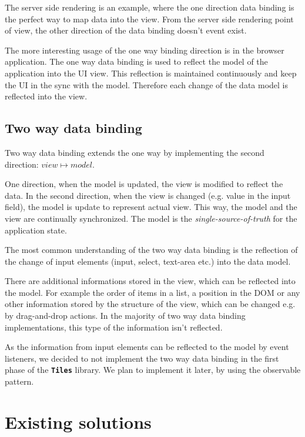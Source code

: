 \documentclass[oneside, 12pt]{book}
\newcommand{\tiles}[0]{\textbf{\texttt{Tiles}} }
\begin{document}
		The server side rendering is an example, 
		where the one direction data binding is the perfect way to map data into the view.
		From the server side rendering point of view, 
		the other direction of the data binding doesn't event exist.

		The more interesting usage of the one way binding direction is in the browser application. 
		The one way data binding is used to reflect the model of the application into the UI view.
		This reflection is maintained continuously and keep the UI in the sync with the model. 
		Therefore each change of the data model is reflected into the view. 

	\section{Two way data binding}

		Two way data binding extends the one way by implementing the second direction: $view \mapsto model$. 

		One direction, when the model is updated, the view is modified to reflect the data.
		In the second direction, when the view is changed (e.g. value in the input field), 
		the model is update to represent actual view. 
		This way, the model and the view are continually synchronized.
		The model is the \textit{single-source-of-truth} for the application state\cite{angular}.

		The most common understanding of the two way data binding is the reflection of the change of input elements
		(input, select, text-area etc.) into the data model.

		There are additional informations stored in the view, which can be reflected into the model.
		For example the order of items in a list, a position in the DOM or any other information stored by the structure of the view, 
		which can be changed e.g. by drag-and-drop actions. 
		In the majority of two way data binding implementations, this type of the information isn't reflected.

		As the information from input elements can be reflected to the model by event listeners, 
		we decided to not implement the two way data binding in the first phase of the \tiles library.
		We plan to implement it later, by using the observable pattern.


\chapter{Existing solutions}\label{chap:existing}
\end{document}
